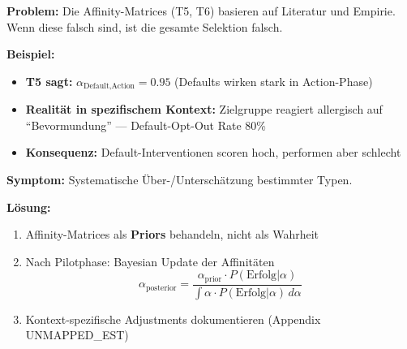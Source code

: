 \begin{tcolorbox}[colback=red!5!white, colframe=red!75!black,
    title=\textbf{Failure Mode 2: Affinity-Matrix-Fehler}]

\textbf{Problem:} Die Affinity-Matrices (T5, T6) basieren auf Literatur und Empirie. Wenn diese falsch sind, ist die gesamte Selektion falsch.

\medskip
\textbf{Beispiel:}
\begin{itemize}[nosep]
    \item \textbf{T5 sagt:} $\alpha_{\text{Default}, \text{Action}} = 0.95$ (Defaults wirken stark in Action-Phase)
    \item \textbf{Realität in spezifischem Kontext:} Zielgruppe reagiert allergisch auf ``Bevormundung'' --- Default-Opt-Out Rate 80\%
    \item \textbf{Konsequenz:} Default-Interventionen scoren hoch, performen aber schlecht
\end{itemize}

\medskip
\textbf{Symptom:} Systematische Über-/Unterschätzung bestimmter Typen.

\textbf{Lösung:}
\begin{enumerate}[nosep]
    \item Affinity-Matrices als \textbf{Priors} behandeln, nicht als Wahrheit
    \item Nach Pilotphase: Bayesian Update der Affinitäten
    \begin{equation*}
    \alpha_{\text{posterior}} = \frac{\alpha_{\text{prior}} \cdot P(\text{Erfolg}|\alpha)}{\int \alpha \cdot P(\text{Erfolg}|\alpha) \, d\alpha}
    \end{equation*}
    \item Kontext-spezifische Adjustments dokumentieren (Appendix UNMAPPED_EST)
\end{enumerate}

\end{tcolorbox}

